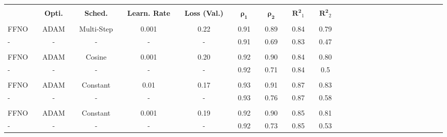 \bgroup
\def\arraystretch{1.5}
\begin{table}[H]
\vspace{3cm}
\hspace{-1.3cm}
\begin{tabular}{llclclclclclclclclclclclclclclcl}
\Xhline{1.5pt}\\[-1.5em]
\textbf{} &  & \textbf{Opti.} &  & \textbf{Sched.} &  & \textbf{Learn. Rate} &  & \textbf{Loss (Val.)} &  & $\boldsymbol{\rho_{1}}$ &  & $\boldsymbol{\rho_{2}}$ &  & $\boldsymbol{R^2}_1$ &  & $\boldsymbol{R^2}_2$ \\[0.4em] 
\cline{1-1} \cline{3-3} \cline{5-5} \cline{7-7} \cline{9-9} \cline{11-11} \cline{13-13} \cline{15-15} \cline{17-17} \\[-1.4em]
FFNO        &  & ADAM      &  & Multi-Step     &  & 0.001        &  & 0.22              &  & 0.91          &  & 0.89          &  & 0.84        &  & 0.79         \\ \rowcolor{Gray}
-     		&  & -         &  &	-			   &  & -            &  & -              &  & 0.91          &  & 0.69          &  & 0.83        &  & 0.47          \\  
\hline \\[-1.4em]
FFNO        &  & ADAM      &  & Cosine         &  & 0.001        &  & 0.20              &  & 0.92          &  & 0.90          &  & 0.84        &  & 0.80         \\ \rowcolor{Gray}
-     		&  & -         &  &	-			   &  & -            &  & -              &  & 0.92          &  & 0.71          &  & 0.84        &  & 0.5          \\  
\hline \\[-1.4em]
FFNO        &  & ADAM      &  & Constant       &  & 0.01         &  & 0.17              &  & 0.93          &  & 0.91          &  & 0.87        &  & 0.83         \\ \rowcolor{Gray}
-     		&  & -         &  &	-			   &  & -            &  & -              &  & 0.93          &  & 0.76          &  & 0.87        &  & 0.58         \\  
\hline \\[-1.4em]
FFNO        &  & ADAM      &  & Constant       &  & 0.001        &  & 0.19              &  & 0.92          &  & 0.90          &  & 0.85        &  & 0.81         \\ \rowcolor{Gray}
-     		&  & -         &  &	-			   &  & -            &  & -              &  & 0.92          &  & 0.73          &  & 0.85        &  & 0.53         \\  [0.2em]

\end{tabular}
\end{table}
